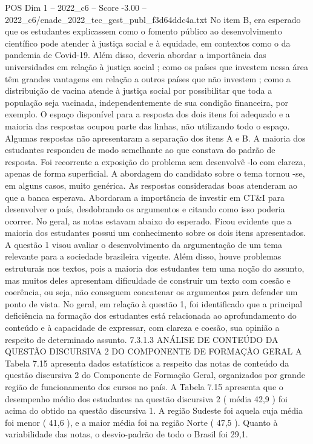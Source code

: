 \begin{textsample}{POS Dim 1 – 2022\_c6 – Score -3.00 – 2022\_c6/enade\_2022\_tec\_gest\_publ\_f3d64ddc4a.txt}
No item B, era esperado que os estudantes explicassem como o fomento público ao desenvolvimento científico pode atender à justiça social e à equidade, em contextos como o da pandemia de Covid-19.
Além disso, deveria abordar a importância das universidades em relação à justiça social ; como os países que investem nessa área têm grandes vantagens em relação a outros países que não investem ; como a distribuição de vacina atende à justiça social por possibilitar que toda a população seja vacinada, independentemente de sua condição financeira, por exemplo.
O espaço disponível para a resposta dos dois itens foi adequado e a maioria das respostas ocupou parte das linhas, não utilizando todo o espaço.
Algumas respostas não apresentaram a separação dos itens A e B.
A maioria dos estudantes respondeu de modo semelhante ao que constava do padrão de resposta.
Foi recorrente a exposição do problema sem desenvolvê -lo com clareza, apenas de forma superficial.
A abordagem do candidato sobre o tema tornou -se, em alguns casos, muito genérica.
As respostas consideradas boas atenderam ao que a banca esperava.
Abordaram a importância de investir em CT\&I para desenvolver o país, desdobrando os argumentos e citando como isso poderia ocorrer.
No geral, as notas estavam abaixo do esperado.
Ficou evidente que a maioria dos estudantes possui um conhecimento sobre os dois itens apresentados.
A questão 1 visou avaliar o desenvolvimento da argumentação de um tema relevante para a sociedade brasileira vigente.
Além disso, houve problemas estruturais nos textos, pois a maioria dos estudantes tem uma noção do assunto, mas muitos deles apresentam dificuldade de construir um texto com coesão e coerência, ou seja, não conseguem concatenar os argumentos para defender um ponto de vista.
No geral, em relação à questão 1, foi identificado que a principal deficiência na formação dos estudantes está relacionada ao aprofundamento do conteúdo e à capacidade de expressar, com clareza e coesão, sua opinião a respeito de determinado assunto. 7.3.1.3 ANÁLISE DE CONTEÚDO DA QUESTÃO DISCURSIVA 2 DO COMPONENTE DE FORMAÇÃO GERAL A Tabela 7.15 apresenta dados estatísticos a respeito das notas de conteúdo da questão discursiva 2 do Componente de Formação Geral, organizados por grande região de funcionamento dos cursos no país.
A Tabela 7.15 apresenta que o desempenho médio dos estudantes na questão discursiva 2 ( média 42,9 ) foi acima do obtido na questão discursiva 1.
A região Sudeste foi aquela cuja média foi menor ( 41,6 ), e a maior média foi na região Norte ( 47,5 ).
Quanto à variabilidade das notas, o desvio-padrão de todo o Brasil foi 29,1.

\end{textsample}

